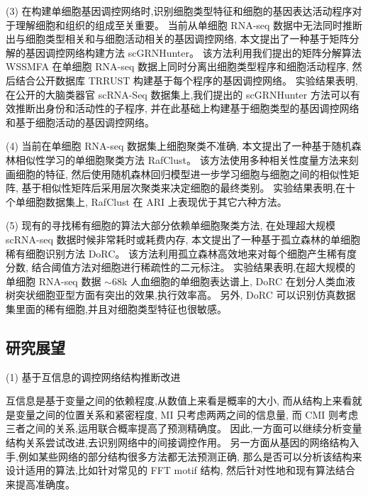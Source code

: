 (3) 在构建单细胞基因调控网络时,识别细胞类型特征和细胞的基因表达活动程序对于理解细胞和组织的组成至关重要。
当前从单细胞 RNA-seq 数据中无法同时推断出与细胞类型相关和与细胞活动相关的基因调控网络,
本文提出了一种基于矩阵分解的基因调控网络构建方法 scGRNHunter。
该方法利用我们提出的矩阵分解算法 WSSMFA 在单细胞 RNA-seq 数据上同时分离出细胞类型程序和细胞活动程序,
然后结合公开数据库 TRRUST 构建基于每个程序的基因调控网络。
实验结果表明,在公开的大脑类器官 scRNA-Seq 数据集上,我们提出的 scGRNHunter 方法可以有效推断出身份和活动性的子程序, 
并在此基础上构建基于细胞类型的基因调控网络和基于细胞活动的基因调控网络。


(4) 当前在单细胞 RNA-seq 数据集上细胞聚类不准确,
本文提出了一种基于随机森林相似性学习的单细胞聚类方法 RafClust。
该方法使用多种相关性度量方法来刻画细胞的特征, 
然后使用随机森林回归模型进一步学习细胞与细胞之间的相似性矩阵,
基于相似性矩阵后采用层次聚类来决定细胞的最终类别。
实验结果表明,在十个单细胞数据集上, RafClust 在 ARI 上表现优于其它六种方法。

(5) 现有的寻找稀有细胞的算法大部分依赖单细胞聚类方法,
在处理超大规模 scRNA-seq 数据时候非常耗时或耗费内存,
本文提出了一种基于孤立森林的单细胞稀有细胞识别方法 DoRC。
该方法利用孤立森林高效地来对每个细胞产生稀有度分数,
结合阈值方法对细胞进行稀疏性的二元标注。
实验结果表明,在超大规模的单细胞 RNA-seq 数据 ${\sim}68$k 人血细胞的单细胞表达谱上,
 DoRC 在划分人类血液树突状细胞亚型方面有突出的效果,执行效率高。
另外, DoRC 可以识别仿真数据集里面的稀有细胞,并且对细胞类型特征也很敏感。

\subsection{研究展望}

(1) 基于互信息的调控网络结构推断改进

互信息是基于变量之间的依赖程度,从数值上来看是概率的大小,
而从结构上来看就是变量之间的位置关系和紧密程度, MI 只考虑两两之间的信息量,
而 CMI 则考虑三者之间的关系,运用联合概率提高了预测精确度。
因此,一方面可以继续分析变量结构关系尝试改进,去识别网络中的间接调控作用。
另一方面从基因的网络结构入手,例如某些网络的部分结构很多方法都无法预测正确,
那么是否可以分析该结构来设计适用的算法,比如针对常见的 FFT motif 结构, 
然后针对性地和现有算法结合来提高准确度。


